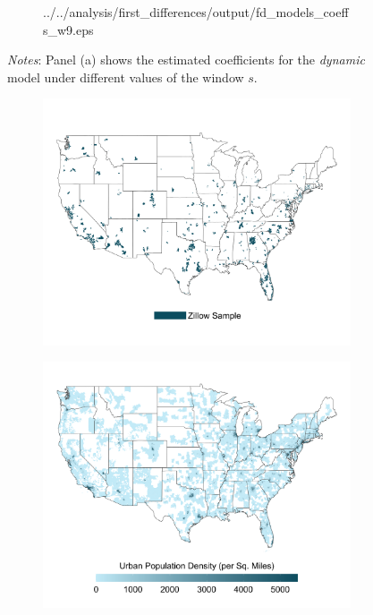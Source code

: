 \documentclass{article}
\begin{document}
\begin{figure}[htb!]
\begin{subfigure}[b]{0.5\textwidth}
		{../../analysis/first_differences/output/fd_models_coeffs_w9.eps}
	\end{subfigure}
	\begin{minipage}{0.95\textwidth} \footnotesize
		\vspace{2mm} 
		\textit{Notes}: Panel (a) shows the estimated coefficients for the \textit{dynamic} model under different values of the window $s$.
	\end{minipage}
\end{figure}

\clearpage
\begin{figure}
	\caption{Comparison Between Zillow Sample and Population Density in CBSAs}
	\begin{subfigure}[b]{\textwidth}\centering
		\includegraphics[width = .9\textwidth]{../../analysis/descriptive_maps/output/sample_map.png}
	\end{subfigure}
	\quad 
	\begin{subfigure}[b]{\textwidth}\centering
		\includegraphics[width = .9\textwidth]{../../analysis/descriptive_maps/output/popurban_density_map.png}
	\end{subfigure}
\end{figure}
\end{document}
